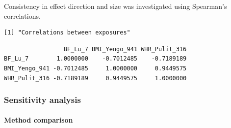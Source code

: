 \documentclass[11pt,twoside]{bristolthesis}
\begin{document}
Consistency in effect direction and size was investigated using Spearman's correlations.
\begin{verbatim}
[1] "Correlations between exposures"
\end{verbatim}
\begin{verbatim}
                 BF_Lu_7 BMI_Yengo_941 WHR_Pulit_316
BF_Lu_7        1.0000000    -0.7012485    -0.7189189
BMI_Yengo_941 -0.7012485     1.0000000     0.9449575
WHR_Pulit_316 -0.7189189     0.9449575     1.0000000
\end{verbatim}
\hypertarget{sensitivity-analysis}{%
\subsubsection{Sensitivity analysis}\label{sensitivity-analysis}}

\hypertarget{method-comparison}{%
\paragraph{Method comparison}\label{method-comparison}}
\end{document}
